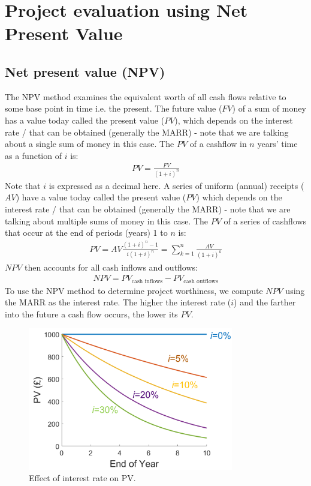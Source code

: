\section{Project evaluation using Net Present Value}
\subsection{Net present value (NPV)}
The NPV method examines the equivalent worth of all cash flows relative to some base point in time i.e. the present. The future value ($FV$) of a sum of money has a value today called the present value ($PV$), which depends on the interest rate / that can be obtained (generally the MARR) - note that we are talking about a single sum of money in this case. The $PV$ of a cashflow in $n$ years' time as a function of $i$ is:
\begin{gather}
  PV = \frac{FV}{\left(1 + i\right)^n}
\end{gather}
Note that $i$ is expressed as a decimal here. A series of uniform (annual) receipts ($AV$) have a value today called the present value ($PV$) which depends on the interest rate / that can be obtained (generally the MARR) - note that we are talking about multiple sums of money in this case. The $PV$ of a series of cashflows that occur at the end of periods (years) 1 to $n$ is:
\begin{gather}
  PV = AV \frac{\left(1+i\right)^n -1}{i\left(1+i\right)^n} = \sum^n_{k=1}\frac{AV}{\left(1+i\right)^k}
\end{gather}
$NPV$ then accounts for all cash inflows and outflows:
\begin{gather}
  NPV = PV_{\textrm{cash inflows}} - PV_{\textrm{cash  outflows}}
\end{gather}
To use the NPV method to determine project worthiness, we compute $NPV$ using the MARR as the interest rate. The higher the interest rate ($i$) and the farther into the future a cash flow occurs, the lower its $PV$.
\begin{figure}[H]
  \centering
  \includegraphics[width = 0.8\textwidth]{./img/figure22.png}
  \caption{Effect of interest rate on PV.}
\end{figure}
